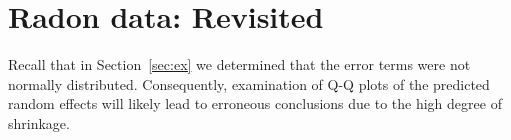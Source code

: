 \documentclass[12pt]{article} %
\begin{document}
%
%
%
%

\section{Radon data: Revisited}\label{sec:radon2}
Recall that in Section~\ref{sec:ex} we determined that the error terms were not normally distributed. Consequently, examination of Q-Q plots of the predicted random effects will likely lead to erroneous conclusions due to the high degree of shrinkage. 
\end{document}
